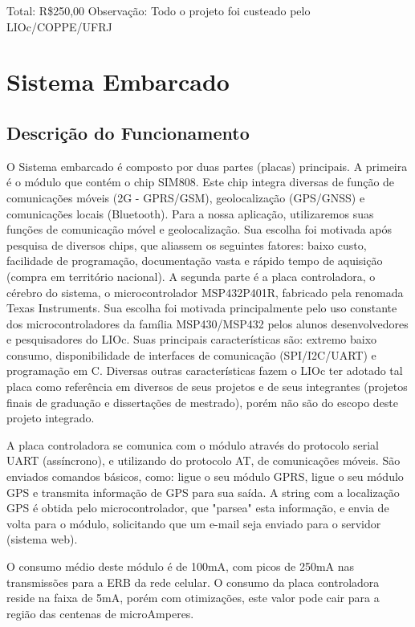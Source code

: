 Total: R\$250,00
Observação: Todo o projeto foi custeado pelo LIOc/COPPE/UFRJ

\section{Sistema Embarcado}

\subsection{Descrição do Funcionamento}
\hspace{0.5cm} O Sistema embarcado é composto por duas partes (placas) principais. A primeira é o módulo que contém o chip SIM808. Este chip integra diversas de função de comunicações móveis (2G - GPRS/GSM), geolocalização (GPS/GNSS) e comunicações locais (Bluetooth). Para a nossa aplicação, utilizaremos suas funções de comunicação móvel e geolocalização. Sua escolha foi motivada após pesquisa de diversos chips, que aliassem os seguintes fatores: baixo custo, facilidade de programação, documentação vasta e rápido tempo de aquisição (compra em território nacional). A segunda parte é a placa controladora, o cérebro do sistema, o microcontrolador MSP432P401R, fabricado pela renomada Texas Instruments. Sua escolha foi motivada principalmente pelo uso constante dos microcontroladores da família MSP430/MSP432 pelos alunos desenvolvedores e pesquisadores do LIOc. Suas principais características são: extremo baixo consumo, disponibilidade de interfaces de comunicação (SPI/I2C/UART) e programação em C. Diversas outras características fazem o LIOc ter adotado tal placa como referência em diversos de seus projetos e de seus integrantes (projetos finais de graduação e dissertações de mestrado), porém não são do escopo deste projeto integrado.

A placa controladora se comunica com o módulo através do protocolo serial UART (assíncrono), e utilizando do protocolo AT, de comunicações móveis. São enviados comandos básicos, como: ligue o seu módulo GPRS, ligue o seu módulo GPS e transmita informação de GPS para sua saída. A string com a localização GPS é obtida pelo microcontrolador, que "parsea" esta informação, e envia de volta para o módulo, solicitando que um e-mail seja enviado para o servidor (sistema web). 

O consumo médio deste módulo é de 100mA, com picos de 250mA nas transmissões para a ERB da rede celular. 
O consumo da placa controladora reside na faixa de 5mA, porém com otimizações, este valor pode cair para a região das centenas de microAmperes.

